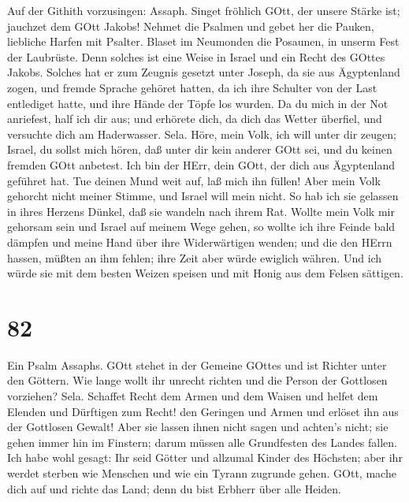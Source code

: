  Auf der Githith vorzusingen: Assaph.  Singet
fröhlich GOtt, der unsere Stärke ist; jauchzet dem GOtt Jakobs!
 Nehmet die Psalmen und gebet her die Pauken, liebliche
Harfen mit Psalter.  Blaset im Neumonden die Posaunen, in
unserm Fest der Laubrüste.  Denn solches ist eine Weise in
Israel und ein Recht des GOttes Jakobs.  Solches hat er zum
Zeugnis gesetzt unter Joseph, da sie aus Ägyptenland zogen, und fremde
Sprache gehöret hatten,  da ich ihre Schulter von der Last
entlediget hatte, und ihre Hände der Töpfe los wurden.  Da
du mich in der Not anriefest, half ich dir aus; und erhörete dich, da
dich das Wetter überfiel, und versuchte dich am Haderwasser. Sela.
 Höre, mein Volk, ich will unter dir zeugen; Israel, du
sollst mich hören,  daß unter dir kein anderer GOtt sei,
und du keinen fremden GOtt anbetest.  Ich bin der HErr,
dein GOtt, der dich aus Ägyptenland geführet hat. Tue deinen Mund weit
auf, laß mich ihn füllen!  Aber mein Volk gehorcht nicht
meiner Stimme, und Israel will mein nicht.  So hab ich sie
gelassen in ihres Herzens Dünkel, daß sie wandeln nach ihrem Rat.
 Wollte mein Volk mir gehorsam sein und Israel auf meinem
Wege gehen,  so wollte ich ihre Feinde bald dämpfen und
meine Hand über ihre Widerwärtigen wenden;  und die den
HErrn hassen, müßten an ihm fehlen; ihre Zeit aber würde ewiglich
währen.  Und ich würde sie mit dem besten Weizen speisen
und mit Honig aus dem Felsen sättigen.

\hypertarget{section-81}{%
\section{82}\label{section-81}}

 Ein Psalm Assaphs. GOtt stehet in der Gemeine GOttes und
ist Richter unter den Göttern.  Wie lange wollt ihr unrecht
richten und die Person der Gottlosen vorziehen? Sela. 
Schaffet Recht dem Armen und dem Waisen und helfet dem Elenden und
Dürftigen zum Recht!  den Geringen und Armen und erlöset ihn
aus der Gottlosen Gewalt!  Aber sie lassen ihnen nicht sagen
und achten's nicht; sie gehen immer hin im Finstern; darum müssen alle
Grundfesten des Landes fallen.  Ich habe wohl gesagt: Ihr
seid Götter und allzumal Kinder des Höchsten;  aber ihr
werdet sterben wie Menschen und wie ein Tyrann zugrunde gehen.
 GOtt, mache dich auf und richte das Land; denn du bist
Erbherr über alle Heiden.

